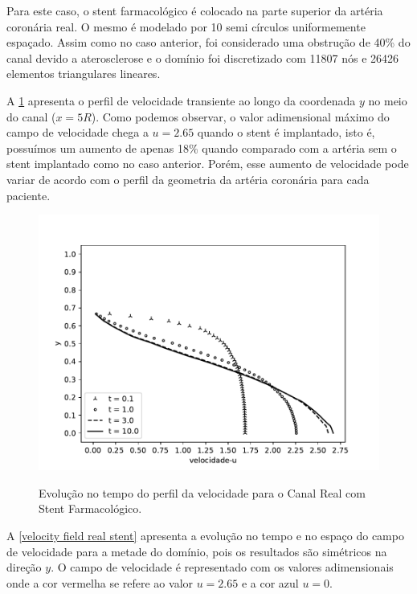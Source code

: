 Para este caso, o stent farmacológico é colocado na parte superior
da artéria coronária real. O mesmo é modelado por 10 semi círculos uniformemente
espaçado. Assim como no caso anterior, foi considerado uma obstrução
de 40\% do canal devido a aterosclerose e o domínio foi
discretizado com 11807 nós e 26426 elementos triangulares lineares. \par
A \ref{velocity evolution real stent} apresenta o perfil
de velocidade transiente ao longo da coordenada $y$ no
meio do canal ($x=5R$). 
Como podemos observar, o valor adimensional máximo do campo de velocidade chega
a $u=2.65$ quando o stent é implantado, isto é, possuímos um aumento de apenas
18\% quando comparado com a artéria sem o stent implantado como no caso anterior.
Porém, esse aumento de velocidade pode variar de acordo com o perfil da geometria da artéria coronária
para cada paciente.

\begin{figure}[H]
     \centering
     \includegraphics[scale=1]{./02_chaps/cap_solution/figure/vel_RealStrut_evol.pdf}\\
     \caption{Evolução no tempo do perfil da velocidade para o Canal Real com Stent Farmacológico.}
     \label{velocity evolution real stent}
\end{figure}

\newpage
A \ref{velocity field real stent} apresenta a evolução no tempo e no espaço
do campo de velocidade para a metade do domínio, pois os resultados são simétricos
na direção $y$. O campo de velocidade é representado com os valores adimensionais
onde a cor vermelha se refere ao valor $u=2.65$ e a cor azul $u=0$.
 
